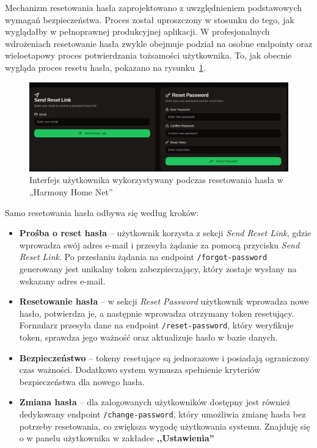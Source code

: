 Mechanizm resetowania hasła zaprojektowano z uwzględnieniem podstawowych wymagań bezpieczeństwa. Proces został uproszczony w stosunku do tego, jak wyglądałby w pełnoprawnej produkcyjnej aplikacji. W profesjonalnych wdrożeniach resetowanie hasła zwykle obejmuje podział na osobne endpointy oraz wieloetapowy proces potwierdzania tożsamości użytkownika. To, jak obecnie wygląda proces resetu hasła, pokazano na rysunku~\ref{fig:ui_password_reset}.

\begin{figure}[ht]
    \centering
    \includegraphics[width=0.95\linewidth]{rys03/pass_resert}
    \caption{Interfejs użytkownika wykorzystywany podczas resetowania hasła w „Harmony Home Net”}
    \label{fig:ui_password_reset}
\end{figure}

\noindent Samo resetowania hasła odbywa się według kroków:
\begin{itemize}
    \item \textbf{Prośba o reset hasła} -- użytkownik korzysta z sekcji \emph{Send Reset Link}, gdzie wprowadza swój adres e-mail i przesyła żądanie za pomocą przycisku \emph{Send Reset Link}. Po przesłaniu żądania na endpoint \texttt{/forgot-password} generowany jest unikalny token zabezpieczający, który zostaje wysłany na wskazany adres e-mail.
    
    \item \textbf{Resetowanie hasła} -- w sekcji \emph{Reset Password} użytkownik wprowadza nowe hasło, potwierdza je, a następnie wprowadza otrzymany token resetujący. Formularz przesyła dane na endpoint \texttt{/reset-password}, który weryfikuje token, sprawdza jego ważność oraz aktualizuje hasło w bazie danych.

    \item \textbf{Bezpieczeństwo} -- tokeny resetujące są jednorazowe i posiadają ograniczony czas ważności. Dodatkowo system wymusza spełnienie kryteriów bezpieczeństwa dla nowego hasła.

    \item \textbf{Zmiana hasła} -- dla zalogowanych użytkowników dostępny jest również dedykowany endpoint \texttt{/change-password}, który umożliwia zmianę hasła bez potrzeby resetowania, co zwiększa wygodę użytkowania systemu. Znajduję się o w panelu użytkownika w zakładce \textbf{,,Ustawienia''}
\end{itemize}


